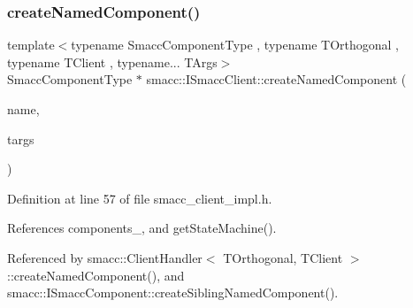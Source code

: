 \subsubsection{\texorpdfstring{create\+Named\+Component()}{createNamedComponent()}}
{\footnotesize\ttfamily template$<$typename Smacc\+Component\+Type , typename T\+Orthogonal , typename T\+Client , typename... T\+Args$>$ \\
Smacc\+Component\+Type $\ast$ smacc\+::\+I\+Smacc\+Client\+::create\+Named\+Component (\begin{DoxyParamCaption}\item[{std\+::string}]{name,  }\item[{T\+Args...}]{targs }\end{DoxyParamCaption})\hspace{0.3cm}{\ttfamily [protected]}}



Definition at line 57 of file smacc\+\_\+client\+\_\+impl.\+h.



References components\+\_\+, and get\+State\+Machine().



Referenced by smacc\+::\+Client\+Handler$<$ T\+Orthogonal, T\+Client $>$\+::create\+Named\+Component(), and smacc\+::\+I\+Smacc\+Component\+::create\+Sibling\+Named\+Component().



